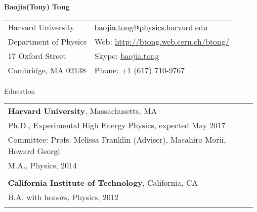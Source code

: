 \documentclass[letterpaper,11pt,oneside]{article}
\newcommand*{\Skype}{\href{skype:baojia.tong?add}{baojia.tong}}
\newcommand{\Absender}[1][\normalsize]{\Skype}
\newcommand{\blue}[1]{\textcolor[rgb]{0,0,0.9}{#1}}
\begin{document}

\noindent  \center \LARGE{\textbf{Baojia(Tony) Tong}}  \\
\normalsize
\begin{center}
\begin{tabular}{l l}
 Harvard University           & \hspace{1in} \href{mailto:baojia.tong@physics.harvard.edu}{baojia.tong@physics.harvard.edu} \\
 Department of Physics    & \hspace{1in} Web: \blue{\href{http://btong.web.cern.ch/btong/}{http://btong.web.cern.ch/btong/}}   \\
 17 Oxford Street              & \hspace{1in} Skype: \Absender  \\
 Cambridge, MA 02138     & \hspace{1in} Phone: +1 (617) 710-9767 \\
\end{tabular}
\end{center}
\noindent\makebox[\linewidth]{\rule{0.8\paperwidth}{0.4pt}}
\vspace{1cm}
\raggedright
 \Large{Education} \\
 \normalsize
\vspace{-1cm}
\begin{flushleft}
\hspace{1cm}
 \begin{tabular}{@{} l}
     \textbf{Harvard University}, Massachusetts, MA \\
     Ph.D., Experimental High Energy Physics, expected May 2017 \\
     Committee: Profs. Melissa Franklin (Adviser), Masahiro Morii, Howard Georgi \\
     M.A., Physics, 2014 \\
     \\
     \textbf{California Institute of Technology}, California, CA \\
     B.A. with honors, Physics, 2012 \\
     \\
 \end{tabular}
\end{flushleft}
 
\end{document}

